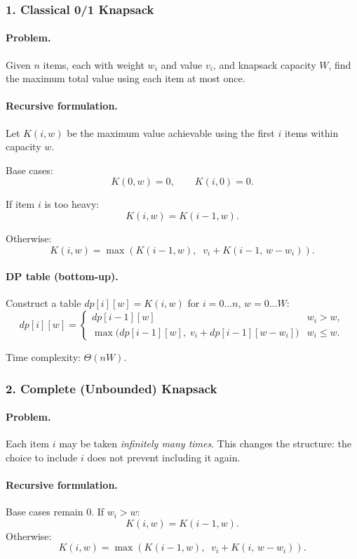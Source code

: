 \documentclass[9pt]{extarticle}
\begin{document}
\subsubsection*{1. Classical 0/1 Knapsack}

\paragraph{Problem.}
Given $n$ items, each with weight $w_i$ and value $v_i$, and knapsack capacity
$W$, find the maximum total value using each item at most once.

\paragraph{Recursive formulation.}
Let $K(i,w)$ be the maximum value achievable using the first $i$ items within
capacity $w$.

Base cases:
\[
K(0,w) = 0,\qquad K(i,0)=0.
\]

If item $i$ is too heavy:
\[
K(i,w) = K(i-1,w).
\]

Otherwise:
\[
K(i,w) = \max\left(K(i-1,w),\;\; v_i + K(i-1,\, w-w_i)\right).
\]

\paragraph{DP table (bottom-up).}
Construct a table $dp[i][w] = K(i,w)$ for $i=0\dots n$, $w=0\dots W$:
\[
dp[i][w] =
\begin{cases}
dp[i-1][w] & w_i > w,\\[6pt]
\max\bigl(dp[i-1][w],\; v_i + dp[i-1][w-w_i]\bigr) & w_i \le w.
\end{cases}
\]

Time complexity: $\Theta(nW)$.

\subsubsection*{2. Complete (Unbounded) Knapsack}

\paragraph{Problem.}
Each item $i$ may be taken \emph{infinitely many times}.  
This changes the structure: the choice to include $i$ does not prevent 
including it again.

\paragraph{Recursive formulation.}
Base cases remain $0$.  If $w_i > w$:
\[
K(i,w) = K(i-1,w).
\]
Otherwise:
\[
K(i,w) = \max\left(K(i-1,w),\;\; v_i + K(i,\, w-w_i)\right).
\]
\end{document}
